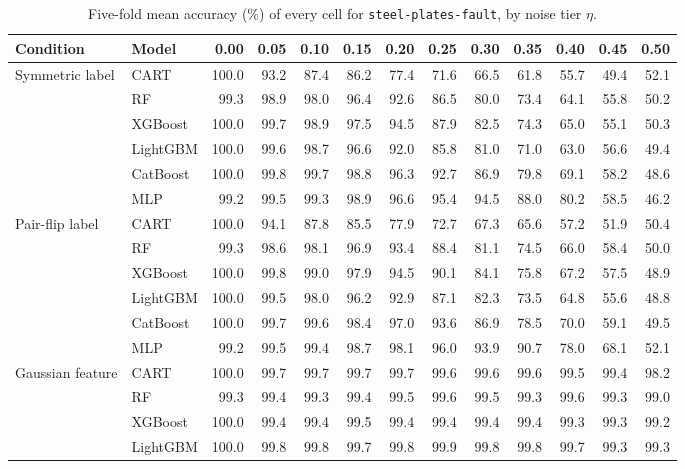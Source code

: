 \begin{table}[p]
\centering
\tiny
\setlength{\tabcolsep}{2.6pt}
\caption{Five-fold mean accuracy (\%) of every cell for \texttt{steel-plates-fault}, by noise tier $\eta$.}
\label{tab:grid_steel_plates_fault}
\begin{tabular}{@{}llrrrrrrrrrrr@{}}
\toprule
Condition & Model & 0.00 & 0.05 & 0.10 & 0.15 & 0.20 & 0.25 & 0.30 & 0.35 & 0.40 & 0.45 & 0.50 \\
\midrule
Symmetric label & CART & 100.0 & 93.2 & 87.4 & 86.2 & 77.4 & 71.6 & 66.5 & 61.8 & 55.7 & 49.4 & 52.1 \\
 & RF & 99.3 & 98.9 & 98.0 & 96.4 & 92.6 & 86.5 & 80.0 & 73.4 & 64.1 & 55.8 & 50.2 \\
 & XGBoost & 100.0 & 99.7 & 98.9 & 97.5 & 94.5 & 87.9 & 82.5 & 74.3 & 65.0 & 55.1 & 50.3 \\
 & LightGBM & 100.0 & 99.6 & 98.7 & 96.6 & 92.0 & 85.8 & 81.0 & 71.0 & 63.0 & 56.6 & 49.4 \\
 & CatBoost & 100.0 & 99.8 & 99.7 & 98.8 & 96.3 & 92.7 & 86.9 & 79.8 & 69.1 & 58.2 & 48.6 \\
 & MLP & 99.2 & 99.5 & 99.3 & 98.9 & 96.6 & 95.4 & 94.5 & 88.0 & 80.2 & 58.5 & 46.2 \\
\midrule
Pair-flip label & CART & 100.0 & 94.1 & 87.8 & 85.5 & 77.9 & 72.7 & 67.3 & 65.6 & 57.2 & 51.9 & 50.4 \\
 & RF & 99.3 & 98.6 & 98.1 & 96.9 & 93.4 & 88.4 & 81.1 & 74.5 & 66.0 & 58.4 & 50.0 \\
 & XGBoost & 100.0 & 99.8 & 99.0 & 97.9 & 94.5 & 90.1 & 84.1 & 75.8 & 67.2 & 57.5 & 48.9 \\
 & LightGBM & 100.0 & 99.5 & 98.0 & 96.2 & 92.9 & 87.1 & 82.3 & 73.5 & 64.8 & 55.6 & 48.8 \\
 & CatBoost & 100.0 & 99.7 & 99.6 & 98.4 & 97.0 & 93.6 & 86.9 & 78.5 & 70.0 & 59.1 & 49.5 \\
 & MLP & 99.2 & 99.5 & 99.4 & 98.7 & 98.1 & 96.0 & 93.9 & 90.7 & 78.0 & 68.1 & 52.1 \\
\midrule
Gaussian feature & CART & 100.0 & 99.7 & 99.7 & 99.7 & 99.7 & 99.6 & 99.6 & 99.6 & 99.5 & 99.4 & 98.2 \\
 & RF & 99.3 & 99.4 & 99.3 & 99.4 & 99.5 & 99.6 & 99.5 & 99.3 & 99.6 & 99.3 & 99.0 \\
 & XGBoost & 100.0 & 99.4 & 99.4 & 99.5 & 99.4 & 99.4 & 99.4 & 99.4 & 99.3 & 99.3 & 99.2 \\
 & LightGBM & 100.0 & 99.8 & 99.8 & 99.7 & 99.8 & 99.9 & 99.8 & 99.8 & 99.7 & 99.3 & 99.3 \\

\end{tabular}
\end{table}
